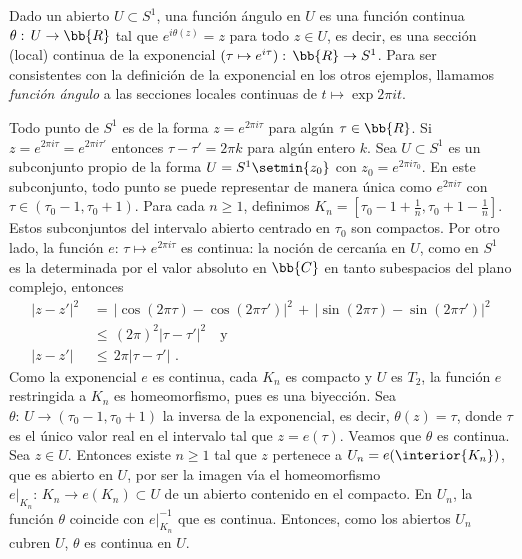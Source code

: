 \begin{ejemplo}
	Dado un abierto $U\subset S^{1}$, una funci\'{o}n
	\'{a}ngulo en $U$ es una funci\'{o}n continua
	$\theta:\,U\rightarrow\bb{R}$ tal que $e^{i\theta(z)}=z$ para todo
	$z\in U$, es decir, es una secci\'{o}n (local) continua de la
	exponencial $(\tau\mapsto e^{i\tau}):\,\bb{R}\rightarrow S^{1}$.
	Para ser consistentes con la definici\'{o}n de la exponencial en
	los otros ejemplos, llamamos \emph{funci\'{o}n \'{a}ngulo} a las
	secciones locales continuas de $t\mapsto\exp{2\pi it}$.

	Todo punto de $S^{1}$ es de la forma $z=e^{2\pi i\tau}$ para alg\'{u}n
	$\tau\in\bb{R}$. Si $z=e^{2\pi i\tau}=e^{2\pi i\tau'}$ entonces
	$\tau-\tau'=2\pi k$ para alg\'{u}n entero $k$.
	Sea $U\subset S^{1}$ es un subconjunto propio de la forma
	$U=S^{1}\setmin\{z_{0}\}$ con $z_{0}=e^{2\pi i\tau_{0}}$. En este
	subconjunto, todo punto se puede representar de manera \'{u}nica
	como $e^{2\pi i\tau}$ con $\tau\in(\tau_{0}-1,\tau_{0}+1)$.
	Para cada $n\geq 1$, definimos
	$K_{n}=[\tau_{0}-1+\frac{1}{n},\tau_{0}+1-\frac{1}{n}]$. Estos
	subconjuntos del intervalo abierto centrado en $\tau_{0}$ son
	compactos. Por otro lado, la funci\'{o}n
	$e:\,\tau\mapsto e^{2\pi i\tau}$ es continua: la noci\'{o}n de
	cercan\'{\i}a en $U$, como en $S^{1}$ es la determinada por el valor
	absoluto en $\bb{C}$ en tanto subespacios del plano complejo, entonces
	\begin{align*}
		|z-z'|^{2} & \,=\, |\cos(2\pi\tau)-\cos(2\pi\tau')|^{2}
			\,+\,|\sin(2\pi\tau)-\sin(2\pi\tau')|^{2} \\
		& \,\leq\, (2\pi)^{2} |\tau-\tau'|^{2}\quad\text{y} \\
		|z-z'| & \,\leq\, 2\pi |\tau-\tau'|
		\text{ .}
	\end{align*}
	Como la exponencial $e$ es continua, cada $K_{n}$ es compacto y $U$
	es $T_{2}$, la funci\'{o}n $e$ restringida a $K_{n}$ es homeomorfismo,
	pues es una biyecci\'{o}n. Sea $\theta:\,U\rightarrow%
	(\tau_{0}-1,\tau_{0}+1)$ la inversa de la exponencial, es decir,
	$\theta(z)=\tau$, donde $\tau$ es el \'{u}nico valor real en el
	intervalo tal que $z=e(\tau)$. Veamos que $\theta$ es continua.
	Sea $z\in U$. Entonces existe $n\geq 1$ tal que $z$ pertenece a
	$U_{n}=e(\interior{K_{n}})$, que es abierto en $U$, por ser la
	imagen v\'{\i}a el homeomorfismo
	$e|_{K_{n}}:\,K_{n}\rightarrow e(K_{n})\subset U$ de un abierto
	contenido en el compacto. En $U_{n}$, la funci\'{o}n $\theta$
	coincide con $e|_{K_{n}}^{-1}$ que es continua. Entonces, como los
	abiertos $U_{n}$ cubren $U$, $\theta$ es continua en $U$.


\end{ejemplo}
